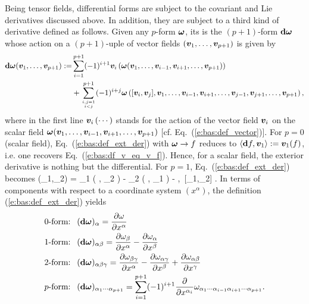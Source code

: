 Being tensor fields, differential forms are subject to the covariant
and Lie derivatives discussed above. In addition, they are subject to a third kind
of derivative defined as follows.  Given any $p$-form $\bm{\omega}$,
its 
is the $(p+1)$-form $\mathbf{d}\bm{\omega}$
whose action on a $(p+1)$-uple of vector fields $(\bm{v}_1,\ldots,\bm{v}_{p+1})$
is given by
\begin{align}
\mathbf{d}\bm{\omega}(\bm{v}_1,\ldots,\bm{v}_{p+1}) := & \sum_{i=1}^{p+1} (-1)^{i+1}
    \bm{v}_i\left(\bm{\omega}(\bm{v}_1,\ldots,\bm{v}_{i-1},\bm{v}_{i+1},\ldots,\bm{v}_{p+1})\right) \nonumber \\
    & + \sum_{i,j=1\atop i < j}^{p+1}
    (-1)^{i+j} \bm{\omega}\left([\bm{v}_i,\bm{v}_j],\bm{v}_1,\ldots,\bm{v}_{i-1},\bm{v}_{i+1},
        \ldots,\bm{v}_{j-1},\bm{v}_{j+1},\ldots,\bm{v}_{p+1}\right) , \label{e:bas:def_ext_der}
\end{align}
where in the first line $\bm{v}_i\left(\cdots\right)$ stands for the action of the vector field
$\bm{v}_i$ on the scalar field $\bm{\omega}(\bm{v}_1,\ldots,\bm{v}_{i-1},\bm{v}_{i+1},\ldots,\bm{v}_{p+1})$
[cf. Eq.~(\ref{e:bas:def_vector})].
For $p=0$ (scalar field), Eq.~(\ref{e:bas:def_ext_der}) with $\bm{\omega}\to f$  reduces
to $\langle \mathbf{d} f, \bm{v}_1 \rangle := \bm{v}_1(f)$, i.e. one recovers Eq.~(\ref{e:bas:df_v_eq_v_f}). Hence, for a
scalar field, the exterior derivative is nothing but the differential. For $p=1$, Eq.~(\ref{e:bas:def_ext_der})
becomes
\be
    \dd\w{\omega}(_1,_2) = _1 \left( \langle \w{\omega}, _2 \rangle \right)
        - _2 \left( \langle \w{\omega}, _1 \rangle \right)
        - \left\langle \w{\omega},\, [_1,_2] \right\rangle .
\ee
In terms of components with respect to a coordinate system $(x^\alpha)$,
the definition (\ref{e:bas:def_ext_der}) yields
\begin{subequations}
\label{e:bas:def_der_ext_comp}
\begin{align}
    \mbox{0-form: \ }  & (\mathbf{d}\bm{\omega})_\alpha =
        \frac{\partial \omega}{\partial x^\alpha} \label{e:bas:def_ext_0f} \\
    \mbox{1-form: \ }  & (\mathbf{d}\bm{\omega})_{\alpha\beta} =
    \frac{\partial \omega_\beta}{\partial x^\alpha} - \frac{\partial \omega_\alpha}{\partial x^\beta}
             \label{e:bas:def_ext_1f} \\
    \mbox{2-form: \ }  & (\mathbf{d}\bm{\omega})_{\alpha\beta\gamma} =
    \frac{\partial \omega_{\beta\gamma}}{\partial x^\alpha} -
    \frac{\partial \omega_{\alpha\gamma}}{\partial x^\beta} +
    \frac{\partial \omega_{\alpha\beta}}{\partial x^\gamma} \label{e:bas:def_ext_2f} \\
     \mbox{$p$-form: \ }  &
     (\mathbf{d}\bm{\omega})_{\alpha_1\cdots\alpha_{p+1}} =
     \sum_{i=1}^{p+1} (-1)^{i+1} \frac{\partial }{\partial x^{\alpha_i}}
     \omega_{\alpha_1\cdots\alpha_{i-1}\alpha_{i+1}\cdots\alpha_{p+1}} .
\end{align}
\end{subequations}

